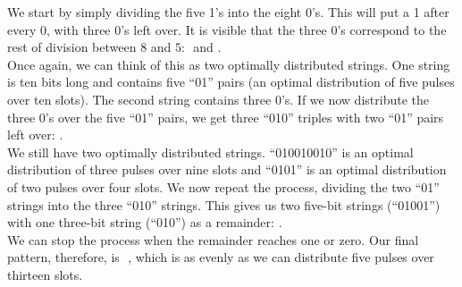 \documentclass[main.tex]{subfiles}
\begin{document}
We start by simply dividing the five 1’s into the eight 0’s. This will put a 1 after every 0, with three 0’s left over. It is visible that the three 0's correspond to the rest of division between \begin{math}8\end{math} and \begin{math}5\end{math}: \begin{math}[0101010101]\end{math} and \begin{math}[000]\end{math}.\\
Once again, we can think of this as two optimally distributed strings. One string is ten bits long and contains five “01” pairs (an optimal distribution of five pulses over ten slots). The second string contains three 0’s. If we now distribute the three 0’s over the five “01” pairs, we get three “010” triples with two “01” pairs left over: \begin{math}[010][010][010] [01][01]\end{math}.\\
We still have two optimally distributed strings. “010010010” is an optimal distribution of three pulses over nine slots and “0101” is an optimal distribution of two pulses over four slots. We now repeat the process, dividing the two “01” strings into the three “010” strings. This gives us two five-bit strings (“01001”) with one three-bit string (“010”) as a remainder: \begin{math}[01001][01001] [010][01]\end{math}.\\
We can stop the process when the remainder reaches one or zero. Our final pattern, therefore, is \begin{math}[0100101001010]\end{math} , which is as evenly as we can distribute five pulses over thirteen slots.
\end{document}
